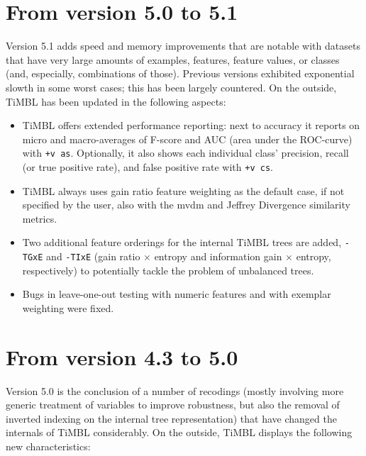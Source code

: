 \documentclass{report}
\begin{document}
\section{From version 5.0 to 5.1}

Version 5.1 adds speed and memory improvements that are notable with
datasets that have very large amounts of examples, features, feature
values, or classes (and, especially, combinations of those). Previous
versions exhibited exponential slowth in some worst cases; this has
been largely countered. On the outside, TiMBL has been updated in the
following aspects:

\begin{itemize}

\item TiMBL offers extended performance reporting: next to accuracy it
  reports on micro and macro-averages of F-score and AUC (area under
  the ROC-curve) with {\tt +v as}. Optionally, it also shows each
  individual class' precision, recall (or true positive rate), and
  false positive rate with {\tt +v cs}.

\item TiMBL always uses gain ratio feature weighting as the default
  case, if not specified by the user, also with the {\sc mvdm} and
  Jeffrey Divergence similarity metrics.

\item Two additional feature orderings for the internal TiMBL trees
  are added, {\tt -TGxE} and {\tt -TIxE} (gain ratio $\times$ entropy
  and information gain $\times$ entropy, respectively) to potentially
  tackle the problem of unbalanced trees.

\item Bugs in leave-one-out testing with numeric features and with
  exemplar weighting were fixed.

\end{itemize}

\section{From version 4.3 to 5.0}

Version 5.0 is the conclusion of a number of recodings (mostly
involving more generic treatment of variables to improve robustness,
but also the removal of inverted indexing on the internal tree
representation) that have changed the internals of TiMBL
considerably. On the outside, TiMBL displays the following new
characteristics:
\end{document}
